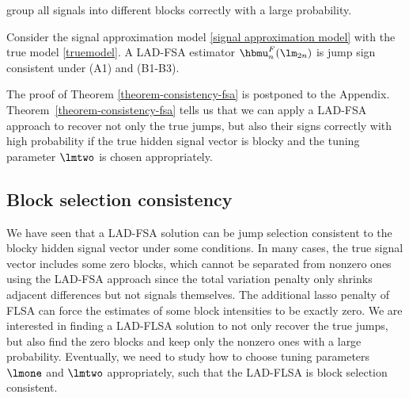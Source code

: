 \documentclass[12pt]{article}
\begin{document}
group  all signals into different blocks correctly with a large probability.
 \begin{theorem}\label{theorem-consistency-fsa}
 Consider the signal approximation model \eqref{signal approximation model}
 with the true model \eqref{truemodel}.
  A LAD-FSA estimator $\hbmu_n^F(\lm_{2n})$ is jump sign consistent under (A1) and (B1-B3).
\end{theorem}
The proof of Theorem \ref{theorem-consistency-fsa} is postponed to the Appendix.
 Theorem~\ref{theorem-consistency-fsa} tells us that we can apply a LAD-FSA approach to  recover not only the true jumps, but also their signs
correctly  with high probability if the true hidden signal vector is blocky
and the tuning parameter $\lmtwo$ is chosen appropriately.



\subsection{Block selection consistency}

We have seen that a LAD-FSA solution can
 be  jump selection consistent
 to the  blocky hidden signal vector
  under some conditions.
 In many cases, the true signal vector
 includes some zero blocks, which cannot be
 separated from nonzero ones using the LAD-FSA
approach since
 the total variation penalty only shrinks adjacent differences but not signals
  themselves.
The additional lasso
 penalty of FLSA can
force the estimates of some block intensities to be exactly zero.
 We are interested in
 finding a LAD-FLSA solution to  not only recover the true jumps, but also find
  the zero blocks and keep only the nonzero ones
   with a large probability. Eventually, we need to
 study how  to choose tuning parameters $\lmone$ and $\lmtwo$
 appropriately, such that the LAD-FLSA is block selection consistent.
\end{document}
